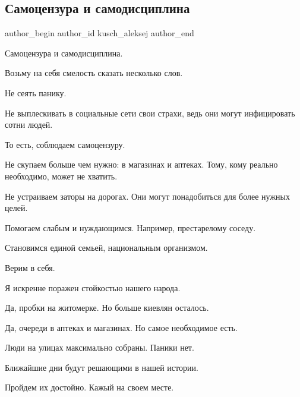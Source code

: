  
 
 
 
 
 
\subsection{Самоцензура и самодисциплина}
\label{sec:24_02_2022.fb.kusch_aleksej.1.samocenzura_i_samodisciplina}
 
\ifcmt
 author_begin
   author_id kusch_aleksej
 author_end
\fi

Самоцензура и самодисциплина.

Возьму на себя смелость сказать несколько слов.

Не сеять панику. 

Не выплескивать в социальные сети свои страхи, ведь они могут инфицировать
сотни людей. 

То есть, соблюдаем самоцензуру.

Не скупаем больше чем нужно: в магазинах и аптеках. Тому, кому реально
необходимо, может не хватить.

Не устраиваем заторы на дорогах. Они могут понадобиться для более нужных целей.

Помогаем слабым и нуждающимся. Например, престарелому соседу. 

Становимся единой семьей, национальным организмом.

Верим в себя.

Я искренне поражен стойкостью нашего народа. 

Да, пробки на житомерке. Но больше киевлян осталось.

Да, очереди в аптеках и магазинах. Но самое необходимое есть.

Люди на улицах максимально собраны. Паники нет.

Ближайшие дни будут решающими в нашей истории.

Пройдем их достойно. Кажый на своем месте.
